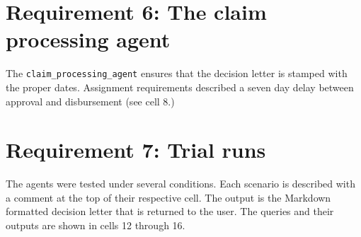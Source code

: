 \documentclass[11pt,letterpaper]{article}
\begin{document}
\section*{Requirement 6: The claim processing agent}
\tab The \texttt{claim\_processing\_agent} ensures that the decision letter is stamped with the proper dates.
Assignment requirements described a seven day delay between approval and disbursement (see cell 8.)

\section*{Requirement 7: Trial runs}
\tab The agents were tested under several conditions. Each scenario is described with a comment at the top of their respective cell.
The output is the Markdown formatted decision letter that is returned to the user. The queries and their outputs are shown in cells 12 through 16.
\end{document}
